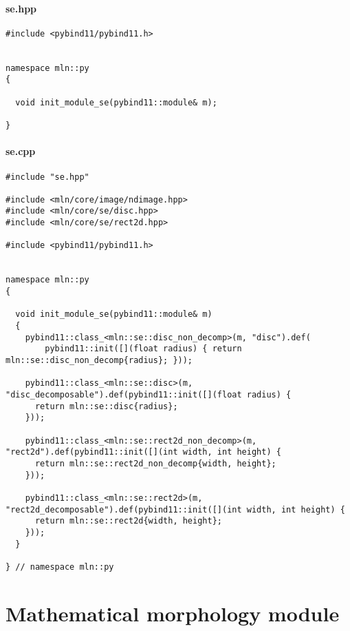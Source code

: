 \paragraph{se.hpp}
\label{appendix:static-dynamic-bridge.se.hpp}

\begin{verbatim}
#include <pybind11/pybind11.h>


namespace mln::py
{

  void init_module_se(pybind11::module& m);

}
\end{verbatim}

\paragraph{se.cpp}
\label{appendix:static-dynamic-bridge.se.cpp}

\begin{verbatim}
#include "se.hpp"

#include <mln/core/image/ndimage.hpp>
#include <mln/core/se/disc.hpp>
#include <mln/core/se/rect2d.hpp>

#include <pybind11/pybind11.h>


namespace mln::py
{

  void init_module_se(pybind11::module& m)
  {
    pybind11::class_<mln::se::disc_non_decomp>(m, "disc").def(
        pybind11::init([](float radius) { return mln::se::disc_non_decomp{radius}; }));

    pybind11::class_<mln::se::disc>(m, "disc_decomposable").def(pybind11::init([](float radius) {
      return mln::se::disc{radius};
    }));

    pybind11::class_<mln::se::rect2d_non_decomp>(m, "rect2d").def(pybind11::init([](int width, int height) {
      return mln::se::rect2d_non_decomp{width, height};
    }));

    pybind11::class_<mln::se::rect2d>(m, "rect2d_decomposable").def(pybind11::init([](int width, int height) {
      return mln::se::rect2d{width, height};
    }));
  }

} // namespace mln::py
\end{verbatim}


\clearpage

\section{Mathematical morphology module}
\label{appendix:static-dynamic-bridge.mm}

